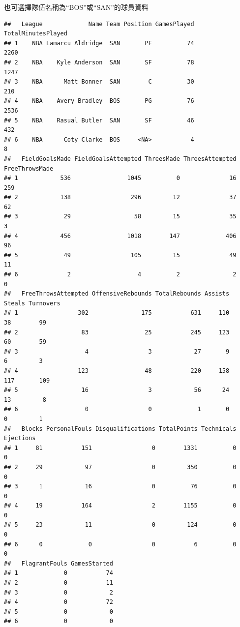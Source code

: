\documentclass[]{book}
\newenvironment{Shaded}{\begin{snugshade}}{\end{snugshade}}
\newcommand{\KeywordTok}[1]{\textcolor[rgb]{0.13,0.29,0.53}{\textbf{{#1}}}}
\newcommand{\StringTok}[1]{\textcolor[rgb]{0.31,0.60,0.02}{{#1}}}
\newcommand{\NormalTok}[1]{{#1}}
\theoremstyle{definition}
\theoremstyle{definition}
\theoremstyle{remark}
\begin{document}
也可選擇隊伍名稱為``BOS''或``SAN''的球員資料

\begin{Shaded}
\end{Shaded}

\begin{verbatim}
##   League             Name Team Position GamesPlayed TotalMinutesPlayed
## 1    NBA Lamarcu Aldridge  SAN       PF          74               2260
## 2    NBA    Kyle Anderson  SAN       SF          78               1247
## 3    NBA      Matt Bonner  SAN        C          30                210
## 4    NBA    Avery Bradley  BOS       PG          76               2536
## 5    NBA    Rasual Butler  SAN       SF          46                432
## 6    NBA      Coty Clarke  BOS     <NA>           4                  8
##   FieldGoalsMade FieldGoalsAttempted ThreesMade ThreesAttempted FreeThrowsMade
## 1            536                1045          0              16            259
## 2            138                 296         12              37             62
## 3             29                  58         15              35              3
## 4            456                1018        147             406             96
## 5             49                 105         15              49             11
## 6              2                   4          2               2              0
##   FreeThrowsAttempted OffensiveRebounds TotalRebounds Assists Steals Turnovers
## 1                 302               175           631     110     38        99
## 2                  83                25           245     123     60        59
## 3                   4                 3            27       9      6         3
## 4                 123                48           220     158    117       109
## 5                  16                 3            56      24     13         8
## 6                   0                 0             1       0      0         1
##   Blocks PersonalFouls Disqualifications TotalPoints Technicals Ejections
## 1     81           151                 0        1331          0         0
## 2     29            97                 0         350          0         0
## 3      1            16                 0          76          0         0
## 4     19           164                 2        1155          0         0
## 5     23            11                 0         124          0         0
## 6      0             0                 0           6          0         0
##   FlagrantFouls GamesStarted
## 1             0           74
## 2             0           11
## 3             0            2
## 4             0           72
## 5             0            0
## 6             0            0
\end{verbatim}
\end{document}
